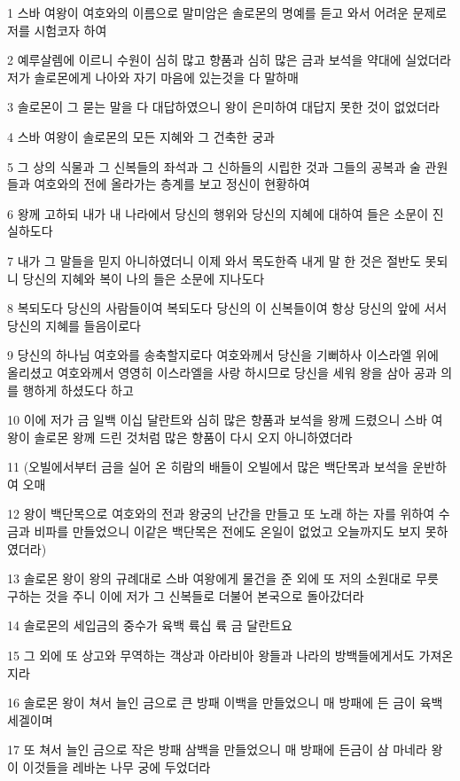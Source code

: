 \par 1 스바 여왕이 여호와의 이름으로 말미암은 솔로몬의 명예를 듣고 와서 어려운 문제로 저를 시험코자 하여
\par 2 예루살렘에 이르니 수원이 심히 많고 향품과 심히 많은 금과 보석을 약대에 실었더라 저가 솔로몬에게 나아와 자기 마음에 있는것을 다 말하매
\par 3 솔로몬이 그 묻는 말을 다 대답하였으니 왕이 은미하여 대답지 못한 것이 없었더라
\par 4 스바 여왕이 솔로몬의 모든 지혜와 그 건축한 궁과
\par 5 그 상의 식물과 그 신복들의 좌석과 그 신하들의 시립한 것과 그들의 공복과 술 관원들과 여호와의 전에 올라가는 층계를 보고 정신이 현황하여
\par 6 왕께 고하되 내가 내 나라에서 당신의 행위와 당신의 지혜에 대하여 들은 소문이 진실하도다
\par 7 내가 그 말들을 믿지 아니하였더니 이제 와서 목도한즉 내게 말 한 것은 절반도 못되니 당신의 지혜와 복이 나의 들은 소문에 지나도다
\par 8 복되도다 당신의 사람들이여 복되도다 당신의 이 신복들이여 항상 당신의 앞에 서서 당신의 지혜를 들음이로다
\par 9 당신의 하나님 여호와를 송축할지로다 여호와께서 당신을 기뻐하사 이스라엘 위에 올리셨고 여호와께서 영영히 이스라엘을 사랑 하시므로 당신을 세워 왕을 삼아 공과 의를 행하게 하셨도다 하고
\par 10 이에 저가 금 일백 이십 달란트와 심히 많은 향품과 보석을 왕께 드렸으니 스바 여왕이 솔로몬 왕께 드린 것처럼 많은 향품이 다시 오지 아니하였더라
\par 11 (오빌에서부터 금을 실어 온 히람의 배들이 오빌에서 많은 백단목과 보석을 운반하여 오매
\par 12 왕이 백단목으로 여호와의 전과 왕궁의 난간을 만들고 또 노래 하는 자를 위하여 수금과 비파를 만들었으니 이같은 백단목은 전에도 온일이 없었고 오늘까지도 보지 못하였더라)
\par 13 솔로몬 왕이 왕의 규례대로 스바 여왕에게 물건을 준 외에 또 저의 소원대로 무릇 구하는 것을 주니 이에 저가 그 신복들로 더불어 본국으로 돌아갔더라
\par 14 솔로몬의 세입금의 중수가 육백 륙십 륙 금 달란트요
\par 15 그 외에 또 상고와 무역하는 객상과 아라비아 왕들과 나라의 방백들에게서도 가져온지라
\par 16 솔로몬 왕이 쳐서 늘인 금으로 큰 방패 이백을 만들었으니 매 방패에 든 금이 육백 세겔이며
\par 17 또 쳐서 늘인 금으로 작은 방패 삼백을 만들었으니 매 방패에 든금이 삼 마네라 왕이 이것들을 레바논 나무 궁에 두었더라
